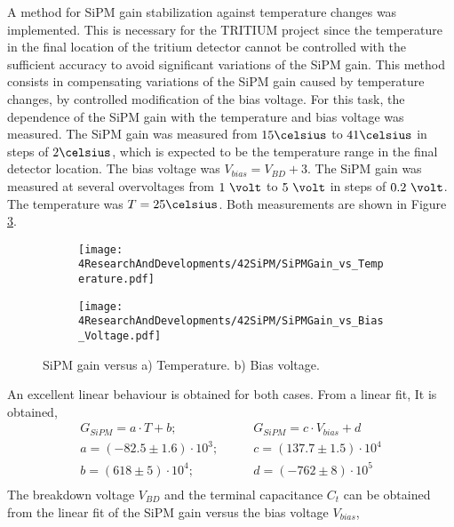 A method for SiPM gain stabilization against temperature changes was implemented. This is necessary for the TRITIUM project since the temperature in the final location of the tritium detector cannot be controlled with the sufficient accuracy to avoid significant variations of the SiPM gain. This method consists in compensating variations of the SiPM gain caused by temperature changes, by controlled modification of the bias voltage. For this task, the dependence of the SiPM gain with the temperature and bias voltage was measured. The SiPM gain was measured from $15\celsius$ to $41\celsius$ in steps of $2\celsius$, which is expected to be the temperature range in the final detector location. The bias voltage was $V_{bias} = V_{BD}+3$. The SiPM gain was measured at several overvoltages from $1~\volt$ to $5~\volt$ in steps of $0.2~\volt$. The temperature was $T=25\celsius$. Both measurements are shown in Figure \ref{fig:SiPMGainDependance}.\begin{figure}
\centering
    \begin{subfigure}[b]{0.9\textwidth}
    \centering
    \texttt{[image: 4ResearchAndDevelopments/42SiPM/SiPMGain\_vs\_Temperature.pdf]}  
    \caption{\label{subfig:SiPMGainvsTemperature}}
    \end{subfigure}
    \hfill
    \begin{subfigure}[b]{0.9\textwidth}
    \centering
    \texttt{[image: 4ResearchAndDevelopments/42SiPM/SiPMGain\_vs\_Bias\_Voltage.pdf]}  
    \caption{\label{subfig:SiPMGainvsBiasVoltage}}
    \end{subfigure}
 \caption{SiPM gain versus a) Temperature. b) Bias voltage.}
 \label{fig:SiPMGainDependance}
\end{figure}
An excellent linear behaviour is obtained for both cases. From a linear fit, It is obtained,
\begin{equation*}
\begin{split}
G_{SiPM}=a \cdot{} T + b;& \qquad G_{SiPM}=c \cdot{} V_{bias} + d\\
a=\left( -82.5 \pm 1.6 \right) \cdot{} 10^{3};& \qquad c=\left( 137.7 \pm 1.5 \right) \cdot{} 10^{4}\\
b=\left( 618 \pm 5 \right) \cdot{} 10^{4};& \qquad d=\left( -762 \pm 8 \right) \cdot{} 10^{5} \\
\label{SiPMGainVSTempV}
\end{split}
\end{equation*} 
The breakdown voltage $V_{BD}$ and the terminal capacitance $C_t$ can be obtained from the linear fit of the SiPM gain versus the bias voltage $V_{bias}$,
